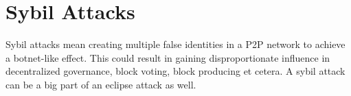 \section{Sybil Attacks}
Sybil attacks mean creating multiple false identities in a P2P network to achieve a botnet-like effect. This could result in gaining disproportionate influence in decentralized governance, block voting, block producing et cetera. A sybil attack can be a big part of an eclipse attack as well.

